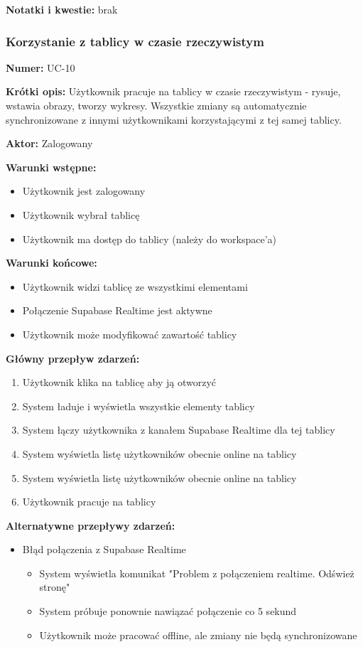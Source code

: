 \documentclass[12pt,a4paper]{article}
\begin{document}
\textbf{Notatki i kwestie:} 
brak

\subsubsection{Korzystanie z tablicy w czasie rzeczywistym}

\textbf{Numer:} UC-10

\textbf{Krótki opis:} Użytkownik pracuje na tablicy w czasie rzeczywistym - rysuje, wstawia obrazy, tworzy wykresy. Wszystkie zmiany są automatycznie synchronizowane z innymi użytkownikami korzystającymi z tej samej tablicy.

\textbf{Aktor:} Zalogowany

\textbf{Warunki wstępne:}
\begin{itemize}[leftmargin=*]
    \item Użytkownik jest zalogowany
    \item Użytkownik wybrał tablicę
    \item Użytkownik ma dostęp do tablicy (należy do workspace'a)
\end{itemize}

\textbf{Warunki końcowe:}
\begin{itemize}[leftmargin=*]
    \item Użytkownik widzi tablicę ze wszystkimi elementami
    \item Połączenie Supabase Realtime jest aktywne
    \item Użytkownik może modyfikować zawartość tablicy
\end{itemize}

\textbf{Główny przepływ zdarzeń:}
\begin{enumerate}[leftmargin=*]
    \item Użytkownik klika na tablicę aby ją otworzyć
    \item System ładuje i wyświetla wszystkie elementy tablicy
    \item System łączy użytkownika z kanałem Supabase Realtime dla tej tablicy
    \item System wyświetla listę użytkowników obecnie online na tablicy
    \item System wyświetla listę użytkowników obecnie online na tablicy
    \item Użytkownik pracuje na tablicy
\end{enumerate}

\textbf{Alternatywne przepływy zdarzeń:}
\begin{itemize}[leftmargin=*]
    \item[3a] Błąd połączenia z Supabase Realtime
    \begin{itemize}
    \item System wyświetla komunikat "Problem z połączeniem realtime. Odśwież stronę"
    \item System próbuje ponownie nawiązać połączenie co 5 sekund
    \item Użytkownik może pracować offline, ale zmiany nie będą synchronizowane
\end{itemize}
\end{itemize}
\end{document}
